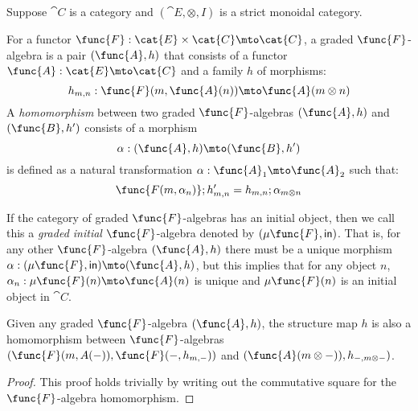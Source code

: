 Suppose $\cat{C}$ is a category and $(\cat{E},\otimes,I)$ is a strict
monoidal category.

\begin{definition}
    For a functor $\func{F} : \cat{E} \times \cat{C} \mto \cat{C}$, a
    graded $\func{F}$-algebra is a pair $(\func{A},h)$ that consists
    of a functor $\func{A} : \cat{E} \mto \cat{C}$ and a family $h$ of
    morphisms:
    \[ 
        h_{m,n} : \func{F}(m,\func{A}(n)) \mto \func{A}(m \otimes n)
    \]
    A \emph{homomorphism} between two graded $\func{F}$-algebras
    $(\func{A},h)$ and $(\func{B},h')$ consists of a morphism
    \[
        \alpha : (\func{A},h) \mto (\func{B},h')
    \]
    is defined as a natural transformation $\alpha : \func{A}_1 \mto
    \func{A}_2$ such that:
    \[
        \func{F(m,\alpha_n)} ; h'_{m,n} = h_{m,n} ; \alpha_{m \otimes n}
    \]
\end{definition}

\begin{definition}
    If the category of graded $\func{F}$-algebras has an initial object, then
    we call this a \emph{graded initial} $\func{F}$-algebra denoted
    by $(\mu\func{F}, \mathsf{in})$.  That is, for any other
    $\func{F}$-algebra $(\func{A},h)$ there must be a unique morphism 
    $\alpha : (\mu\func{F}, \mathsf{in}) \mto (\func{A},h)$, but this
    implies that for any object $n$, $\alpha_n : \mu\func{F}(n) \mto
    \func{A}(n)$ is unique and $\mu\func{F}(n)$ is an initial object
    in $\cat{C}$.
\end{definition}

\begin{lemma}
\label{lemma:from_structures_to_homomorphisms}
Given any graded $\func{F}$-algebra $(\func{A},h)$, the structure map
$h$ is also a homomorphism between $\func{F}$-algebras
$(\func{F}(m,A(-)),\func{F}(-,h_{m,-}))$ and $(\func{A}(m \otimes -)),h_{-, m \otimes -})$.
\end{lemma}
\begin{proof}
This proof holds trivially by writing out the commutative square for
the $\func{F}$-algebra homomorphism.
\end{proof}

